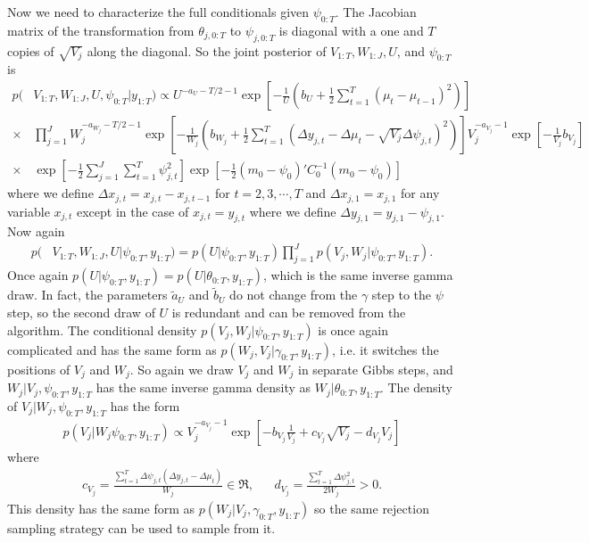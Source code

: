 \documentclass[graybox]{svmult}
\begin{document}
Now we need to characterize the full conditionals given $\psi_{0:T}$. The Jacobian matrix of the transformation from $\theta_{j,0:T}$ to $\psi_{j,0:T}$ is diagonal with a one and $T$ copies of $\sqrt{V_j}$ along the diagonal. So the joint posterior of $V_{1:T},W_{1:J},U$, and $\psi_{0:T}$ is
\begin{align*}
p(&V_{1:T},W_{1:J},U,\psi_{0:T}|y_{1:T}) \propto U^{-a_U-T/2-1}\exp\left[-\frac{1}{U}\left(b_U + \frac{1}{2}\sum_{t=1}^T(\mu_t - \mu_{t-1})^2\right)\right]\\
\times& \prod_{j=1}^JW_j^{-a_{W_j}-T/2-1}\exp\left[-\frac{1}{W_j}\left(b_{W_j} + \frac{1}{2}\sum_{t=1}^T\left(\Delta y_{j,t} - \Delta\mu_{t} - \sqrt{V_j}\Delta\psi_{j,t}\right)^2\right)\right]V_j^{-a_{V_j}-1}\exp\left[-\frac{1}{V_j}b_{V_j}\right]\\
\times&\exp\left[-\frac{1}{2}\sum_{j=1}^J\sum_{t=1}^T\psi_{j,t}^2\right]\exp\left[-\frac{1}{2}(m_0 - \psi_0)'C_0^{-1}(m_0 - \psi_0)\right]
\end{align*}
where we define $\Delta x_{j,t}=x_{j,t} - x_{j,t-1}$ for $t=2,3,\cdots,T$ and $\Delta x_{j,1} = x_{j,1}$ for any variable $x_{j,t}$ except in the case of $x_{j,t}=y_{j,t}$ where we define $\Delta y_{j,1} = y_{j,1} - \psi_{j,1}$. Now again
\begin{align*}
p(&V_{1:T},W_{1:J},U|\psi_{0:T},y_{1:T})=p(U|\psi_{0:T},y_{1:T})\prod_{j=1}^Jp(V_j,W_j|\psi_{0:T},y_{1:T}).
\end{align*}
Once again $p(U|\psi_{0:T},y_{1:T})=p(U|\theta_{0:T},y_{1:T})$, which is the same inverse gamma draw. In fact, the parameters $\tilde{a}_{U}$ and $\tilde{b}_U$ do not change from the $\gamma$ step to the $\psi$ step, so the second draw of $U$ is redundant and can be removed from the algorithm. The conditional density $p(V_j,W_j|\psi_{0:T},y_{1:T})$ is once again complicated and has the same form as $p(W_j,V_j|\gamma_{0:T},y_{1:T})$, i.e. it switches the positions of $V_j$ and $W_j$. So again we draw $V_j$ and $W_j$ in separate Gibbs steps, and $W_j|V_j,\psi_{0:T},y_{1:T}$ has the same inverse gamma density as $W_j|\theta_{0:T},y_{1:T}$. The density of $V_j|W_j,\psi_{0:T},y_{1:T}$ has the form
\begin{align*}
p(V_j|W_j\psi_{0:T},y_{1:T}) \propto V_j^{-a_{V_j}-1}\exp\left[-b_{V_j}\frac{1}{V_j} + c_{V_j}\sqrt{V_j} - d_{V_j}V_j\right]
\end{align*}
where
\begin{align*}
c_{V_j}=\frac{\sum_{t=1}^T\Delta\psi_{j,t}(\Delta y_{j,t} - \Delta \mu_t)}{W_j}\in\Re,&&d_{V_j} = \frac{\sum_{t=1}^T\Delta \psi_{j,t}^2}{2W_j} >0.
\end{align*}
This density has the same form as $p(W_j|V_j,\gamma_{0:T},y_{1:T})$ so the same rejection sampling strategy can be used to sample from it.
\end{document}
